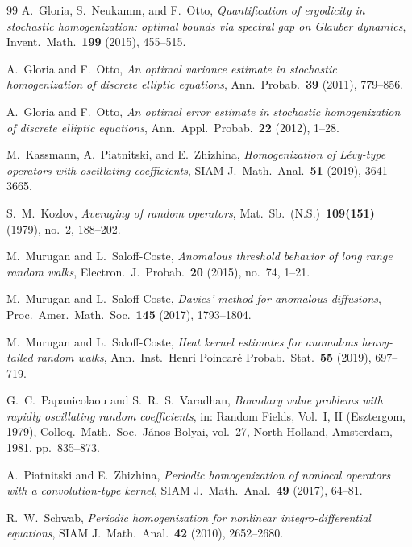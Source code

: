 \documentclass[11pt]{amsart}
\theoremstyle{plain}
\theoremstyle{definition}
\theoremstyle{remark}
\begin{document}
\begin{thebibliography}{99}
		A.~Gloria, S.~Neukamm, and F.~Otto,
		\emph{Quantification of ergodicity in stochastic homogenization: optimal bounds via spectral gap on Glauber dynamics},
		Invent.\ Math.\ \textbf{199} (2015), 455--515.
		
		A.~Gloria and F.~Otto,
		\emph{An optimal variance estimate in stochastic homogenization of discrete elliptic equations},
		Ann.\ Probab.\ \textbf{39} (2011), 779--856.
		
		A.~Gloria and F.~Otto,
		\emph{An optimal error estimate in stochastic homogenization of discrete elliptic equations},
		Ann.\ Appl.\ Probab.\ \textbf{22} (2012), 1--28.
		
		M.~Kassmann, A.~Piatnitski, and E.~Zhizhina,
		\emph{Homogenization of L\'evy-type operators with oscillating coefficients},
		SIAM J.\ Math.\ Anal.\ \textbf{51} (2019), 3641--3665.
		
		S.~M.~Kozlov,
		\emph{Averaging of random operators},
		Mat.\ Sb.\ (N.S.)\ \textbf{109(151)} (1979), no.~2, 188--202.
		
		M.~Murugan and L.~Saloff-Coste,
		\emph{Anomalous threshold behavior of long range random walks},
		Electron.\ J.\ Probab.\ \textbf{20} (2015), no.~74, 1--21.
		
		M.~Murugan and L.~Saloff-Coste,
		\emph{Davies' method for anomalous diffusions},
		Proc.\ Amer.\ Math.\ Soc.\ \textbf{145} (2017), 1793--1804.
		
		M.~Murugan and L.~Saloff-Coste,
		\emph{Heat kernel estimates for anomalous heavy-tailed random walks},
		Ann.\ Inst.\ Henri Poincar\'e Probab.\ Stat.\ \textbf{55} (2019), 697--719.
		
		G.~C.~Papanicolaou and S.~R.~S.~Varadhan,
		\emph{Boundary value problems with rapidly oscillating random coefficients},
		in: Random Fields, Vol.~I, II (Esztergom, 1979), Colloq.\ Math.\ Soc.\ J\'anos Bolyai, vol.~27, North-Holland, Amsterdam, 1981, pp.~835--873.
		
		A.~Piatnitski and E.~Zhizhina,
		\emph{Periodic homogenization of nonlocal operators with a convolution-type kernel},
		SIAM J.\ Math.\ Anal.\ \textbf{49} (2017), 64--81.
		
		R.~W.~Schwab,
		\emph{Periodic homogenization for nonlinear integro-differential equations},
		SIAM J.\ Math.\ Anal.\ \textbf{42} (2010), 2652--2680.
		

\end{thebibliography}
\end{document}
